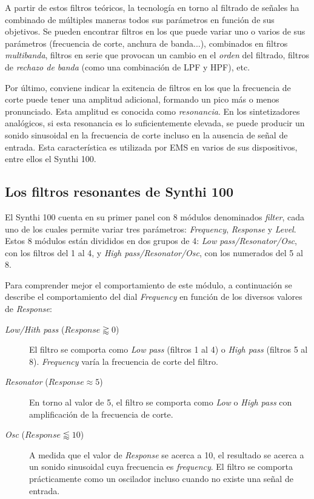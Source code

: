 A partir de estos filtros teóricos, la tecnología en torno al filtrado de señales ha combinado de múltiples maneras todos sus parámetros en función de sus objetivos. Se pueden encontrar filtros en los que puede variar uno o varios de sus parámetros (frecuencia de corte, anchura de banda...), combinados en filtros \textit{multibanda}, filtros en serie que provocan un cambio en el \textit{orden} del filtrado, filtros de \textit{rechazo de banda} (como una combinación de LPF y HPF), etc.

Por último, conviene indicar la exitencia de filtros en los que la frecuencia de corte puede tener una amplitud adicional, formando un pico más o menos pronunciado. Esta amplitud es conocida como \textit{resonancia}. En los sintetizadores analógicos, si esta resonancia es lo suficientemente elevada, se puede producir un sonido sinusoidal en la frecuencia de corte incluso en la ausencia de señal de entrada. Esta característica es utilizada por EMS en varios de sus dispositivos, entre ellos el Synthi 100.


\subsection{Los filtros resonantes de Synthi 100}

El Synthi 100 cuenta en su primer panel con 8 módulos denominados \textit{filter}, cada uno de los cuales permite variar tres parámetros: \textit{Frequency}, \textit{Response} y \textit{Level}. Estos 8 módulos están divididos en dos grupos de 4: \textit{Low pass/Resonator/Osc}, con los filtros del 1 al 4, y \textit{High pass/Resonator/Osc}, con los numerados del 5 al 8.

Para comprender mejor el comportamiento de este módulo, a continuación se describe el comportamiento del dial \textit{Frequency} en función de los diversos valores de \textit{Response}:

\begin{description}
	\item[\textit{Low/Hith pass} ($\textit{Response} \gtrapprox 0$)] El filtro se comporta como \textit{Low pass} (filtros 1 al 4) o \textit{High pass} (filtros 5 al 8). \textit{Frequency} varía la frecuencia de corte del filtro.
	\item[\textit{Resonator} ($\textit{Response} \approx 5$)] En torno al valor de 5, el filtro se comporta como \textit{Low} o \textit{High pass} con amplificación de la frecuencia de corte.
	\item[\textit{Osc} ($\textit{Response} \lessapprox 10$)] A medida que el valor de \textit{Response} se acerca a 10, el resultado se acerca a un sonido sinusoidal cuya frecuencia es \textit{frequency}. El filtro se comporta prácticamente como un oscilador incluso cuando no existe una señal de entrada. 
\end{description}


